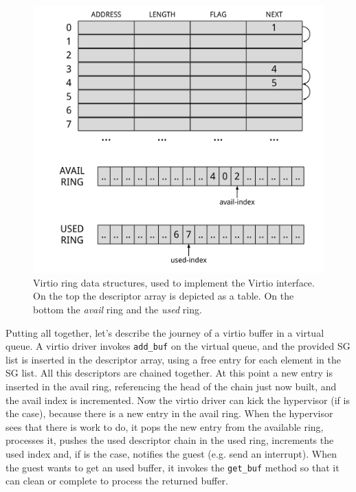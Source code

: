 \begin{figure}[bt]
\centering
\includegraphics[scale = 0.48]{vring.pdf}
\caption{Virtio ring data structures, used to implement the Virtio interface. On the top the descriptor array is depicted as a table.
	 On the bottom the \emph{avail} ring and the \emph{used} ring.}
\label{fig:vring}
\end{figure}

\vspace{0.5cm}

Putting all together, let's describe the journey of a virtio buffer in a virtual queue. A virtio driver invokes \texttt{add\_buf} on the
virtual queue, and the provided SG list is inserted in the descriptor array, using a free entry for each element in the SG list. All this
descriptors are chained together. At this point a new entry is inserted in the avail ring, referencing the head of the chain just now
built, and the avail index is incremented.
Now the virtio driver can kick the hypervisor (if is the case), because there is a new entry in the avail ring.
When the hypervisor sees that there is work to do, it pops the new entry from the available ring, processes it, pushes the used descriptor
chain in the used ring, increments the used index and, if is the case, notifies the guest (e.g. send an interrupt). When the guest wants 
to get an used buffer, it invokes the \texttt{get\_buf} method so that it can clean or complete to process the returned buffer.


